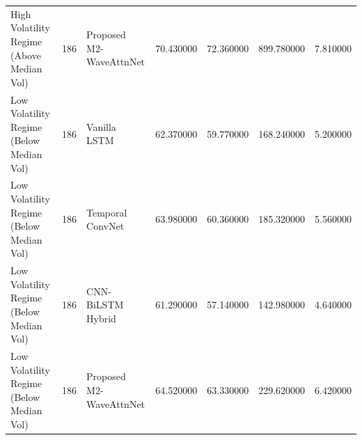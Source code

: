 \begin{table}
\begin{tabular}{lrlrrrr}
High Volatility Regime (Above Median Vol) & 186 & Proposed M2-WaveAttnNet & 70.430000 & 72.360000 & 899.780000 & 7.810000 \\
Low Volatility Regime (Below Median Vol) & 186 & Vanilla LSTM & 62.370000 & 59.770000 & 168.240000 & 5.200000 \\
Low Volatility Regime (Below Median Vol) & 186 & Temporal ConvNet & 63.980000 & 60.360000 & 185.320000 & 5.560000 \\
Low Volatility Regime (Below Median Vol) & 186 & CNN-BiLSTM Hybrid & 61.290000 & 57.140000 & 142.980000 & 4.640000 \\
Low Volatility Regime (Below Median Vol) & 186 & Proposed M2-WaveAttnNet & 64.520000 & 63.330000 & 229.620000 & 6.420000 \\
\bottomrule
\end{tabular}
\end{table}
